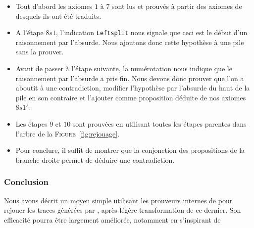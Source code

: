 \begin{itemize}
\item Tout d'abord les axiomes $1$ à $7$ sont lus et prouvés à partir des axiomes de \holfour desquels ils ont été traduits.
\item A l'étape $8s1$, l'indication \verb!Leftsplit! nous signale que
  ceci est le début d'un raisonnement par l'absurde. Nous ajoutons donc
  cette hypothèse à une pile sans la prouver.
\item Avant de passer à l'étape suivante, la numérotation nous indique que le raisonnement par l'absurde a pris fin. Nous devons donc prouver que l'on a aboutit à une contradiction, modifier l'hypothèse par l'absurde du haut de la pile en son contraire et l'ajouter comme proposition déduite de nos axiomes $8s1'$.
\item Les étapes $9$ et $10$ sont prouvées en utilisant toutes les étapes parentes dans l'arbre de la \textsc{Figure}~\ref{fig:rejouage}.
\item Pour conclure, il suffit de montrer que la conjonction des propositions de la branche droite permet de déduire une contradiction.
\end{itemize}


\subsubsection{Conclusion}

Nous avons décrit un moyen simple utilisant les prouveurs internes de
\holfour pour rejouer les traces générées par \beagle, après légère
transformation de ce dernier. Son efficacité pourra être largement
améliorée, notamment en s'inspirant
de~\cite{Paulson10,DBLP:conf/cpp/ArmandFGKTW11}



